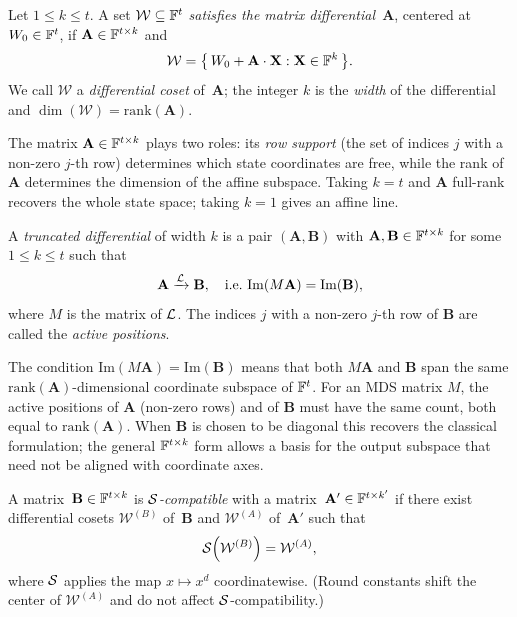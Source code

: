 \documentclass[11pt]{article}
\begin{document}
\begin{definition}
    Let $1\leq k\leq t$.
    A set $\mathcal{W}\subseteq\mathbb{F}^t$ \emph{satisfies the matrix differential~$\mathbf{A}$},
    centered at $W_0\in\mathbb{F}^t$, if $\mathbf{A}\in\mathbb{F}^{t\times k}$ and
    \[
        \mathcal{W} = \bigl\{\,W_0 + \mathbf{A}\cdot\mathbf{X} : \mathbf{X}\in\mathbb{F}^k\,\bigr\}.
    \]
    We call $\mathcal{W}$ a \emph{differential coset} of~$\mathbf{A}$; the integer
    $k$ is the \emph{width} of the differential and $\dim(\mathcal{W}) = \mathrm{rank}(\mathbf{A})$.
\end{definition}

\begin{remark}
    The matrix $\mathbf{A}\in\mathbb{F}^{t\times k}$ plays two roles: its \emph{row support}
    (the set of indices $j$ with a non-zero $j$-th row) determines which state coordinates
    are free, while the rank of $\mathbf{A}$ determines the dimension of the affine subspace.
    Taking $k=t$ and $\mathbf{A}$ full-rank recovers the whole state space; taking $k=1$
    gives an affine line.
\end{remark}

\begin{definition}
    A \emph{truncated differential} of width $k$ is a pair $(\mathbf{A},\mathbf{B})$
    with $\mathbf{A},\mathbf{B}\in\mathbb{F}^{t\times k}$ for some $1\leq k\leq t$ such that
    \[
        \mathbf{A} \xrightarrow{\mathcal{L}}\mathbf{B},
        \quad\text{i.e.\ }\mathrm{Im}(M\mathbf{A}) = \mathrm{Im}(\mathbf{B}),
    \]
    where $M$ is the matrix of $\mathcal{L}$.
    The indices $j$ with a non-zero $j$-th row of $\mathbf{B}$ are called the \emph{active positions}.
\end{definition}

\begin{remark}
    The condition $\mathrm{Im}(M\mathbf{A}) = \mathrm{Im}(\mathbf{B})$ means that both
    $M\mathbf{A}$ and $\mathbf{B}$ span the same $\mathrm{rank}(\mathbf{A})$-dimensional
    coordinate subspace of $\mathbb{F}^t$.  For an MDS matrix $M$, the active positions of
    $\mathbf{A}$ (non-zero rows) and of $\mathbf{B}$ must have the same count, both
    equal to $\mathrm{rank}(\mathbf{A})$.
    When $\mathbf{B}$ is chosen to be diagonal this recovers the classical formulation;
    the general $\mathbb{F}^{t\times k}$ form allows a basis for the output subspace that need
    not be aligned with coordinate axes.
\end{remark}

\begin{definition}
    A matrix~$\mathbf{B}\in\mathbb{F}^{t\times k}$ is \emph{$\mathcal{S}$-compatible} with a matrix~$\mathbf{A}'\in\mathbb{F}^{t\times k'}$
    if there exist differential cosets $\mathcal{W}^{(B)}$ of~$\mathbf{B}$ and
    $\mathcal{W}^{(A)}$ of~$\mathbf{A}'$ such that
    \[
        \mathcal{S}\!\left(\mathcal{W}^{(B)}\right) = \mathcal{W}^{(A)},
    \]
    where $\mathcal{S}$ applies the map $x\mapsto x^d$ coordinatewise.
    (Round constants shift the center of $\mathcal{W}^{(A)}$ and do not affect $\mathcal{S}$-compatibility.)
\end{definition}
\end{document}
